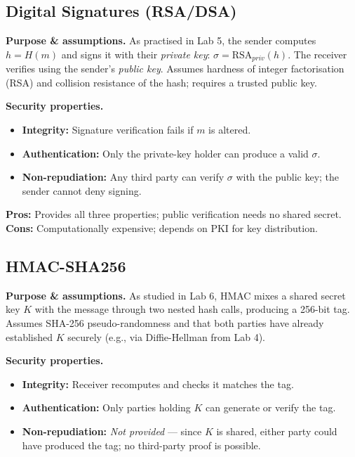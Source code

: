 \documentclass[twocolumn, 10pt]{article}
\begin{document}
\subsection{Digital Signatures (RSA/DSA)}

\textbf{Purpose \& assumptions.} As practised in Lab 5, the sender computes $h{=}H(m)$ and signs it with their \emph{private key}: $\sigma = \text{RSA}_\mathit{priv}(h)$. The receiver verifies using the sender's \emph{public key}. Assumes hardness of integer factorisation (RSA) and collision resistance of the hash; requires a trusted public key.

\textbf{Security properties.}
\begin{itemize}[leftmargin=*, itemsep=0pt, topsep=1pt]
    \item \textbf{Integrity:} Signature verification fails if $m$ is altered.
    \item \textbf{Authentication:} Only the private-key holder can produce a valid $\sigma$.
    \item \textbf{Non-repudiation:} Any third party can verify $\sigma$ with the public key; the sender cannot deny signing.
\end{itemize}

\textbf{Pros:} Provides all three properties; public verification needs no shared secret.\\
\textbf{Cons:} Computationally expensive; depends on PKI for key distribution.

\subsection{HMAC-SHA256}

\textbf{Purpose \& assumptions.} As studied in Lab 6, HMAC mixes a shared secret key $K$ with the message through two nested hash calls, producing a 256-bit tag. Assumes SHA-256 pseudo-randomness and that both parties have already established $K$ securely (e.g., via Diffie-Hellman from Lab 4).

\textbf{Security properties.}
\begin{itemize}[leftmargin=*, itemsep=0pt, topsep=1pt]
    \item \textbf{Integrity:} Receiver recomputes  and checks it matches the tag.
    \item \textbf{Authentication:} Only parties holding $K$ can generate or verify the tag.
    \item \textbf{Non-repudiation:} \emph{Not provided} --- since $K$ is shared, either party could have produced the tag; no third-party proof is possible.
\end{itemize}
\end{document}
